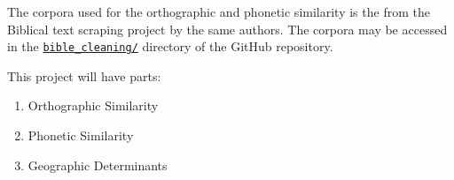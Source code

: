 The corpora used for the orthographic and phonetic similarity is the from the
Biblical text scraping project by the same authors. The corpora may be accessed
in the
\href{https://github.com/zrygan/nlp/tree/master/bible_cleaning}{\texttt{bible\_cleaning/}}
directory of the GitHub repository.

This project will have \todo parts:
\begin{enumerate}
    \item Orthographic Similarity
    \item Phonetic Similarity
    \item Geographic Determinants
\end{enumerate}